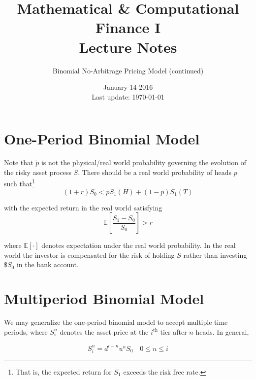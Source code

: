\documentclass[12pt]{article}
\newlength\tindent
\renewcommand{\indent}{\hspace*{\tindent}}
\newcommand{\E}{\mathbb E}
\begin{document}
 
 
\title{Mathematical \& Computational Finance I\\Lecture Notes}
\author{Binomial No-Arbitrage Pricing Model (continued)}
\date{January 14 2016 \\ Last update: \today{}}
\maketitle

\section{One-Period Binomial Model}

\indent Note that $\tilde{p}$ is not the physical/real world probability governing the evolution of the risky asset process $S$. There should be a real world probability of heads $p$ such that\footnote{That is, the expected return for $S_1$ exceeds the risk free rate.}
\begin{equation*}
	(1 + r)S_0 < pS_1(H) + (1 - p)S_1(T)
\end{equation*}

with the expected return in the real world satisfying
\begin{equation*}
	\E \left[ \frac{S_1 - S_0}{S_0} \right] > r
\end{equation*}

where $\E[\cdot]$ denotes expectation under the real world probability. In the real world the investor is compensated for the risk of holding $S$ rather than investing $\$S_0$ in the bank account.

\section{Multiperiod Binomial Model}

\indent We may generalize the one-period binomial model to accept multiple time periods, where $S^n_i$ denotes the asset price at the $i^{\text{th}}$ tier after $n$ heads. In general,

\begin{equation*}
	S^n_i = d^{i - n}u^nS_0 \quad 0 \leq n \leq i
\end{equation*}
\end{document}
